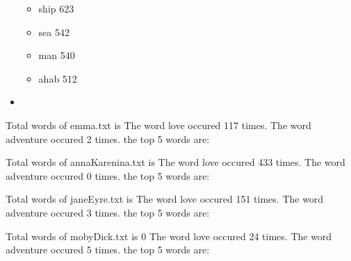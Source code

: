 \documentclass[a4paper,11pt,oneside]{book}
\begin{document}
\begin{itemize}
{{\begin{itemize}
				\item{ship		623}
				\item{sea		542}
				\item{man		540}
				\item{ahab	512}
			\end{itemize}}
		}
	\item{}
\end{itemize}


Total words of emma.txt is 
The word love occured 117 times.
The word adventure occured 2 times.
the top 5 words are: 








Total words of annaKarenina.txt is 
The word love occured 433 times.
The word adventure occured 0 times.
the top 5 words are: 



Total words of janeEyre.txt is 
The word love occured 151 times.
The word adventure occured 3 times.
the top 5 words are: 


Total words of mobyDick.txt is 0
The word love occured 24 times.
The word adventure occured 5 times.
the top 5 words are: 
\end{document}
